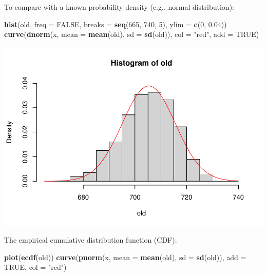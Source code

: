 \documentclass[
]{article}
\newenvironment{Shaded}{\begin{snugshade}}{\end{snugshade}}
\newcommand{\AttributeTok}[1]{\textcolor[rgb]{0.13,0.29,0.53}{#1}}
\newcommand{\ConstantTok}[1]{\textcolor[rgb]{0.56,0.35,0.01}{#1}}
\newcommand{\DecValTok}[1]{\textcolor[rgb]{0.00,0.00,0.81}{#1}}
\newcommand{\FloatTok}[1]{\textcolor[rgb]{0.00,0.00,0.81}{#1}}
\newcommand{\FunctionTok}[1]{\textcolor[rgb]{0.13,0.29,0.53}{\textbf{#1}}}
\newcommand{\NormalTok}[1]{#1}
\newcommand{\StringTok}[1]{\textcolor[rgb]{0.31,0.60,0.02}{#1}}
\begin{document}
To compare with a known probability density (e.g., normal distribution):

\begin{Shaded}
\begin{Highlighting}[]
\FunctionTok{hist}\NormalTok{(old, }\AttributeTok{freq =} \ConstantTok{FALSE}\NormalTok{, }\AttributeTok{breaks =} \FunctionTok{seq}\NormalTok{(}\DecValTok{665}\NormalTok{, }\DecValTok{740}\NormalTok{, }\DecValTok{5}\NormalTok{), }\AttributeTok{ylim =} \FunctionTok{c}\NormalTok{(}\DecValTok{0}\NormalTok{, }\FloatTok{0.04}\NormalTok{))}
\FunctionTok{curve}\NormalTok{(}\FunctionTok{dnorm}\NormalTok{(x, }\AttributeTok{mean =} \FunctionTok{mean}\NormalTok{(old), }\AttributeTok{sd =} \FunctionTok{sd}\NormalTok{(old)), }\AttributeTok{col =} \StringTok{"red"}\NormalTok{, }\AttributeTok{add =} \ConstantTok{TRUE}\NormalTok{)}
\end{Highlighting}
\end{Shaded}

\includegraphics{EDA_files/figure-latex/unnamed-chunk-19-1.pdf}

The empirical cumulative distribution function (CDF):

\begin{Shaded}
\begin{Highlighting}[]
\FunctionTok{plot}\NormalTok{(}\FunctionTok{ecdf}\NormalTok{(old))}
\FunctionTok{curve}\NormalTok{(}\FunctionTok{pnorm}\NormalTok{(x, }\AttributeTok{mean =} \FunctionTok{mean}\NormalTok{(old), }\AttributeTok{sd =} \FunctionTok{sd}\NormalTok{(old)), }\AttributeTok{add =} \ConstantTok{TRUE}\NormalTok{, }\AttributeTok{col =} \StringTok{"red"}\NormalTok{)}
\end{Highlighting}
\end{Shaded}
\end{document}
